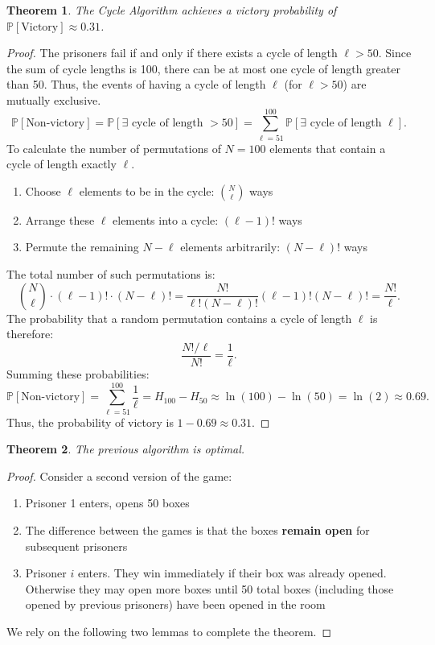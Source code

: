 \documentclass[a4paper]{article}
\newtheorem{thm}{Theorem}[section]
\begin{document}
\begin{thm}
    The Cycle Algorithm achieves a victory probability of $\mathbb{P}[\text{Victory}] \approx 0.31$.
\end{thm}
\begin{proof}
    The prisoners fail if and only if there exists a cycle of length $\ell > 50$. Since the sum of cycle lengths is 100, there can be at most one cycle of length greater than 50. Thus, the events of having a cycle of length $\ell$ (for $\ell > 50$) are mutually exclusive.
    \[
    \mathbb{P}[\text{Non-victory}] = \mathbb{P}[\exists \text{ cycle of length } > 50] = \sum_{\ell=51}^{100} \mathbb{P}[\exists \text{ cycle of length } \ell].
    \]
    To calculate the number of permutations of $N=100$ elements that contain a cycle of length exactly $\ell$.
    \begin{enumerate}
        \item Choose $\ell$ elements to be in the cycle: $\binom{N}{\ell}$ ways
        \item Arrange these $\ell$ elements into a cycle: $(\ell-1)!$ ways
        \item Permute the remaining $N-\ell$ elements arbitrarily: $(N-\ell)!$ ways
    \end{enumerate}
    The total number of such permutations is:
    \[
    \binom{N}{\ell} \cdot (\ell - 1)! \cdot (N - \ell)! = \frac{N!}{\ell!(N-\ell)!} (\ell - 1)! (N - \ell)! = \frac{N!}{\ell}.
    \]
    The probability that a random permutation contains a cycle of length $\ell$ is therefore:
    \[
     \frac{N! / \ell}{N!} = \frac{1}{\ell}.
    \]
    Summing these probabilities:
    \[
     \mathbb{P}[\text{Non-victory}] = \sum_{\ell=51}^{100} \frac{1}{\ell} = H_{100} - H_{50} \approx \ln(100) - \ln(50) = \ln(2) \approx 0.69.
    \]
    Thus, the probability of victory is $1 - 0.69 \approx 0.31$.
\end{proof}
\begin{thm}
    The previous algorithm is optimal. 
\end{thm}
\begin{proof}
    Consider a second version of the game:
    \begin{enumerate}
        \item Prisoner 1 enters, opens 50 boxes 
        \item The difference between the games is that the boxes \textbf{remain open} for subsequent prisoners
        \item Prisoner $i$ enters. They win immediately if their box was already opened. Otherwise they may open more boxes until 50 total boxes (including those opened by previous prisoners) have been opened in the room
    \end{enumerate}
    We rely on the following two lemmas to complete the theorem.
\end{proof}
\end{document}
